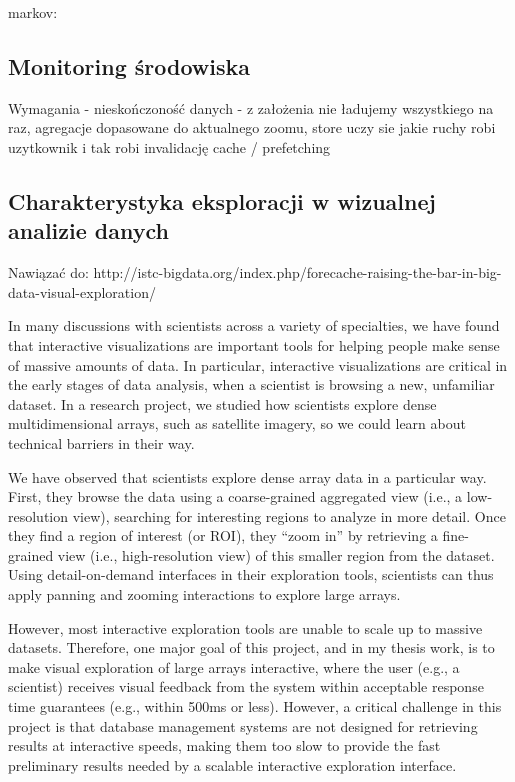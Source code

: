 markov: \cite{lee2002adaptation}
\subsection{Monitoring środowiska}

Wymagania - nieskończoność danych - z założenia nie ładujemy wszystkiego na raz,
agregacje dopasowane do aktualnego zoomu, store uczy sie jakie ruchy robi uzytkownik i tak robi invalidację cache / prefetching



\subsection{Charakterystyka eksploracji w wizualnej analizie danych}
Nawiązać do:
http://istc-bigdata.org/index.php/forecache-raising-the-bar-in-big-data-visual-exploration/


In many discussions with scientists across a variety of specialties, we have found that interactive visualizations are important tools for helping people make sense of massive amounts of data. In particular, interactive visualizations are critical in the early stages of data analysis, when a scientist is browsing a new, unfamiliar dataset. In a research project, we studied how scientists explore dense multidimensional arrays, such as satellite imagery, so we could learn about technical barriers in their way.

We have observed that scientists explore dense array data in a particular way. First, they browse the data using a coarse-grained aggregated view (i.e., a low-resolution view), searching for interesting regions to analyze in more detail. Once they find a region of interest (or ROI), they “zoom in” by retrieving a fine-grained view (i.e., high-resolution view) of this smaller region from the dataset. Using detail-on-demand interfaces in their exploration tools, scientists can thus apply panning and zooming interactions to explore large arrays.

However, most interactive exploration tools are unable to scale up to massive datasets. Therefore, one major goal of this project, and in my thesis work, is to make visual exploration of large arrays interactive, where the user (e.g., a scientist) receives visual feedback from the system within acceptable response time guarantees (e.g., within 500ms or less). However, a critical challenge in this project is that database management systems are not designed for retrieving results at interactive speeds, making them too slow to provide the fast preliminary results needed by a scalable interactive exploration interface.



